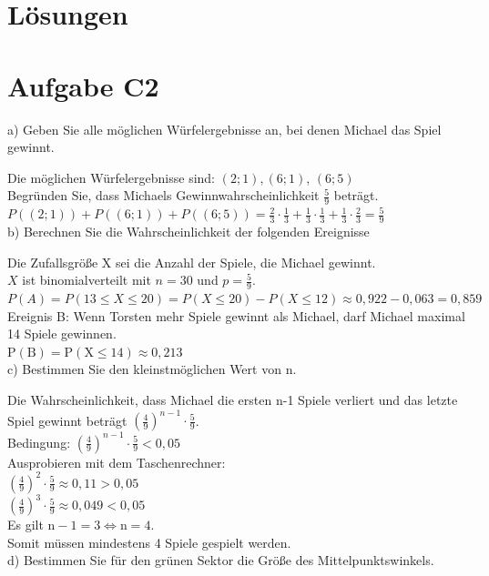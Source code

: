 \documentclass[10pt]{article}
\begin{document}
\section*{Lösungen}
\section*{Aufgabe C2}
a) Geben Sie alle möglichen Würfelergebnisse an, bei denen Michael das Spiel gewinnt.

Die möglichen Würfelergebnisse sind: $(2 ; 1),(6 ; 1)$, $(6 ; 5)$\\
Begründen Sie, dass Michaels Gewinnwahrscheinlichkeit $\frac{5}{9}$ beträgt.\\
$P((2 ; 1))+P((6 ; 1))+P((6 ; 5))=\frac{2}{3} \cdot \frac{1}{3}+\frac{1}{3} \cdot \frac{1}{3}+\frac{1}{3} \cdot \frac{2}{3}=\frac{5}{9}$\\
b) Berechnen Sie die Wahrscheinlichkeit der folgenden Ereignisse

Die Zufallsgröße X sei die Anzahl der Spiele, die Michael gewinnt.\\
$X$ ist binomialverteilt mit $n=30$ und $p=\frac{5}{9}$.\\
$P(A)=P(13 \leq X \leq 20)=P(X \leq 20)-P(X \leq 12) \approx 0,922-0,063=0,859$\\
Ereignis B: Wenn Torsten mehr Spiele gewinnt als Michael, darf Michael maximal 14 Spiele gewinnen.\\
$\mathrm{P}(\mathrm{B})=\mathrm{P}(\mathrm{X} \leq 14) \approx 0,213$\\
c) Bestimmen Sie den kleinstmöglichen Wert von n.

Die Wahrscheinlichkeit, dass Michael die ersten n-1 Spiele verliert und das letzte Spiel gewinnt beträgt $\left(\frac{4}{9}\right)^{n-1} \cdot \frac{5}{9}$.\\
Bedingung: $\left(\frac{4}{9}\right)^{n-1} \cdot \frac{5}{9}<0,05$\\
Ausprobieren mit dem Taschenrechner:\\
$\left(\frac{4}{9}\right)^{2} \cdot \frac{5}{9} \approx 0,11>0,05$\\
$\left(\frac{4}{9}\right)^{3} \cdot \frac{5}{9} \approx 0,049<0,05$\\
Es gilt $\mathrm{n}-1=3 \Leftrightarrow \mathrm{n}=4$.\\
Somit müssen mindestens 4 Spiele gespielt werden.\\
d) Bestimmen Sie für den grünen Sektor die Größe des Mittelpunktswinkels.
\end{document}
